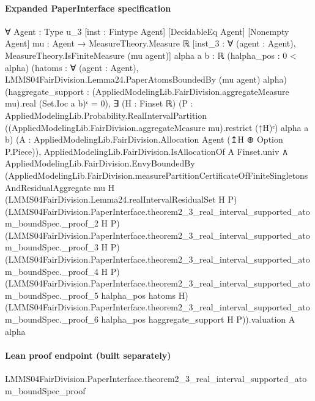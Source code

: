\documentclass[10pt]{article}
\begin{document}
\paragraph{Expanded PaperInterface specification}
\begin{ReviewVerbatim}
∀ {Agent : Type u_3} [inst : Fintype Agent] [DecidableEq Agent] [Nonempty Agent] {mu : Agent → MeasureTheory.Measure ℝ}
  [inst_3 : ∀ (agent : Agent), MeasureTheory.IsFiniteMeasure (mu agent)] {alpha a b : ℝ} (halpha_pos : 0 < alpha)
  (hatoms : ∀ (agent : Agent), LMMS04FairDivision.Lemma24.PaperAtomsBoundedBy (mu agent) alpha)
  (haggregate_support : (AppliedModelingLib.FairDivision.aggregateMeasure mu).real (Set.Ioc a b)ᶜ = 0),
  ∃ (H : Finset ℝ) (P :
    AppliedModelingLib.Probability.RealIntervalPartition
      ((AppliedModelingLib.FairDivision.aggregateMeasure mu).restrict (↑H)ᶜ) alpha a b)
    (A : AppliedModelingLib.FairDivision.Allocation Agent (↥H ⊕ Option P.Piece)),
    AppliedModelingLib.FairDivision.IsAllocationOf A Finset.univ ∧
      AppliedModelingLib.FairDivision.EnvyBoundedBy
        (AppliedModelingLib.FairDivision.measurePartitionCertificateOfFiniteSingletonsAndResidualAggregate mu H
            (LMMS04FairDivision.Lemma24.realIntervalResidualSet H P)
            (LMMS04FairDivision.PaperInterface.theorem2_3_real_interval_supported_atom_boundSpec._proof_2 H P)
            (LMMS04FairDivision.PaperInterface.theorem2_3_real_interval_supported_atom_boundSpec._proof_3 H P)
            (LMMS04FairDivision.PaperInterface.theorem2_3_real_interval_supported_atom_boundSpec._proof_4 H P)
            (LMMS04FairDivision.PaperInterface.theorem2_3_real_interval_supported_atom_boundSpec._proof_5 halpha_pos
              hatoms H)
            (LMMS04FairDivision.PaperInterface.theorem2_3_real_interval_supported_atom_boundSpec._proof_6 halpha_pos
              haggregate_support H P)).valuation
        A alpha
\end{ReviewVerbatim}



\paragraph{Lean proof endpoint (built separately)}\begin{ReviewVerbatim}
LMMS04FairDivision.PaperInterface.theorem2_3_real_interval_supported_atom_boundSpec_proof
\end{ReviewVerbatim}
\end{document}
